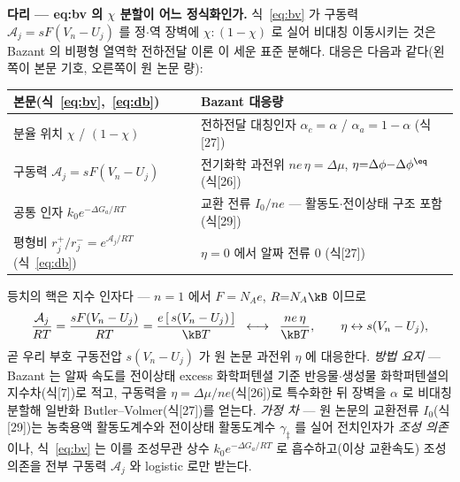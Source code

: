 
\begin{srcbox}
\textbf{다리 --- eq:bv 의 $\chi$ 분할이 어느 정식화인가.} 식~\eqref{eq:bv} 가 구동력
$\mathcal A_j=sF(V_n-U_j)$ 를 정$\cdot$역 장벽에 $\chi:(1-\chi)$ 로 실어 비대칭 이동시키는 것은
Bazant 의 비평형 열역학 전하전달 이론\cite{bazant2013} 이 세운 표준 분해다. 대응은 다음과 같다(왼쪽이
본문 기호, 오른쪽이 원 논문 량):
\begin{center}\footnotesize
\begin{tabular}{@{}ll@{}}
\hline
본문(식~\eqref{eq:bv},~\eqref{eq:db}) & Bazant\cite{bazant2013} 대응량 \\
\hline
분율 위치 $\chi$ / $(1-\chi)$ & 전하전달 대칭인자 $\alpha_c{=}\alpha$ / $\alpha_a{=}1{-}\alpha$ (식[27]) \\
구동력 $\mathcal A_j=sF(V_n-U_j)$ & 전기화학 과전위 $ne\,\eta=\Delta\mu$, $\eta{=}\Delta\phi{-}\Delta\phi^{\eq}$ (식[26]) \\
공통 인자 $k_0e^{-\Delta G_a/RT}$ & 교환 전류 $I_0/ne$ --- 활동도$\cdot$전이상태 구조 포함 (식[29]) \\
평형비 $r_j^+/r_j^-=e^{\mathcal A_j/RT}$ (식~\eqref{eq:db}) & $\eta{=}0$ 에서 알짜 전류 $0$ (식[27]) \\
\hline
\end{tabular}
\end{center}
등치의 핵은 지수 인자다 --- $n{=}1$ 에서 $F{=}N_A e$, $R{=}N_A\kB$ 이므로
\begin{equation}
\frac{\mathcal A_j}{RT}=\frac{sF(V_n-U_j)}{RT}=\frac{e\,[\,s(V_n-U_j)\,]}{\kB T}
\;\;\longleftrightarrow\;\;\frac{ne\,\eta}{\kB T},\qquad \eta \leftrightarrow s(V_n-U_j),
\label{eq:br-bazant2013-1}
\end{equation}
곧 우리 부호 구동전압 $s(V_n-U_j)$ 가 원 논문 과전위 $\eta$ 에 대응한다. \emph{방법 요지} --- Bazant 는 알짜
속도를 전이상태 excess 화학퍼텐셜 기준 반응물$\cdot$생성물 화학퍼텐셜의 지수차(식[7])로 적고, 구동력을
$\eta=\Delta\mu/ne$(식[26])로 특수화한 뒤 장벽을 $\alpha$ 로 비대칭 분할해 일반화 Butler--Volmer(식[27])를
얻는다. \emph{가정 차} --- 원 논문의 교환전류 $I_0$(식[29])는 농축용액 활동도계수와 전이상태 활동도계수
$\gamma_\ddagger$ 를 실어 전치인자가 \emph{조성 의존}이나, 식~\eqref{eq:bv} 는 이를 조성무관 상수
$k_0e^{-\Delta G_a/RT}$ 로 흡수하고(이상 교환속도) 조성 의존을 전부 구동력 $\mathcal A_j$ 와 logistic 로만
받는다.
\end{srcbox}
